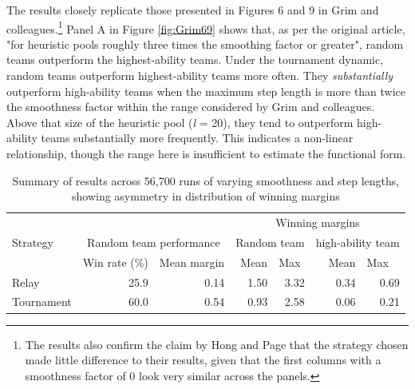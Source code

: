  The results closely replicate those presented in Figures 6 and 9 in Grim and colleagues.\footnote{The results also confirm the claim by Hong and Page that the strategy chosen made little difference to their results, given that the first columns with a smoothness factor of 0 look very similar across the panels.} Panel A in Figure \ref{fig:Grim69} shows that, as per the original article, "for heuristic pools roughly three times the smoothing factor or greater", random teams outperform the highest-ability teams. Under the tournament dynamic, random teams outperform highest-ability teams more often. They \textit{substantially} outperform high-ability teams when the maximum step length is more than twice the smoothness factor within the range considered by Grim and colleagues. Above that size of the heuristic pool (\textit{l} = 20), they tend to outperform high-ability teams substantially more frequently. This indicates a non-linear relationship, though the range here is insufficient to estimate the functional form. \\
 
 \begin{table}
  \centering
  \caption{Summary of results across 56,700 runs of varying smoothness and step lengths, showing asymmetry in distribution of winning margins}
  \label{tab:win_comp}
\begin{tabular}{lrrrrrr}
  \toprule
  \multicolumn{3}{c}{}& \multicolumn{4}{c|}{Winning margins}\\
  Strategy & \multicolumn{2}{|c|}{Random team performance} & \multicolumn{2}{l|}{Random team} & \multicolumn{2}{l|}{high-ability team}\\
       &  \multicolumn{1}{|l}{Win rate (\%)} &  \multicolumn{1}{l|}{Mean margin} &  Mean &  \multicolumn{1}{l|}{Max} &  Mean &  \multicolumn{1}{l|}{Max} \\
  \midrule
       Relay &          25.9 &            0.14 &         1.50 &        3.32 &       0.34 &      0.69 \\
   Tournament &          60.0 &            0.54 &         0.93 &        2.58 &       0.06 &      0.21 \\
  \bottomrule
  \end{tabular}
\end{table} 
 
